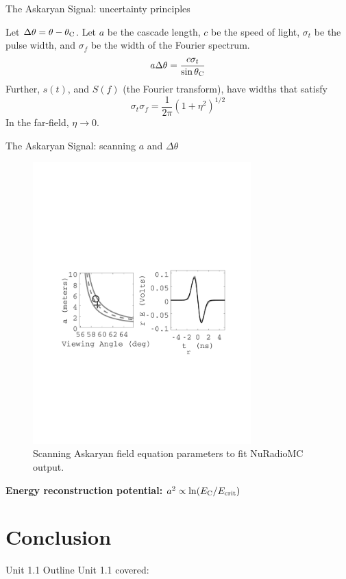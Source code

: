 \documentclass{beamer}
\begin{document}
\begin{frame}{The Askaryan Signal: uncertainty principles}
\begin{tcolorbox}[colback=box_background,colframe=box_frame,title={Uncertainty principles within Askaryan field}]
Let $\Delta\theta = \theta - \theta_{\rm C}$.  Let $a$ be the cascade length, $c$ be the speed of light, $\sigma_t$ be the pulse width, and $\sigma_f$ be the width of the Fourier spectrum.
\begin{equation}
a\Delta\theta = \frac{c\sigma_t}{\sin\theta_{\rm C}}
\end{equation}
Further, $s(t)$, and $S(f)$ (the Fourier transform), have widths that satisfy
\begin{equation}
\sigma_t \sigma_f = \frac{1}{2\pi}\left(1+\eta^2\right)^{1/2}
\end{equation}
In the far-field, $\eta \to 0$.
\end{tcolorbox}
\end{frame}

\begin{frame}[fragile]{The Askaryan Signal: scanning $a$ and $\Delta\theta$}
\begin{figure}
\centering
\includegraphics[width=0.75\textwidth,trim=2cm 9cm 2cm 10cm,clip=true]{example_scan.pdf}
\caption{\label{fig:scan} Scanning Askaryan field equation parameters to fit NuRadioMC output.}
\end{figure}
\textbf{Energy reconstruction potential:} $a^2 \propto \ln(E_{\rm C}/E_{\rm crit})$
\end{frame}

\section{Conclusion}

\begin{frame}{Unit 1.1 Outline}
Unit 1.1 covered:

\end{frame}
\end{document}
